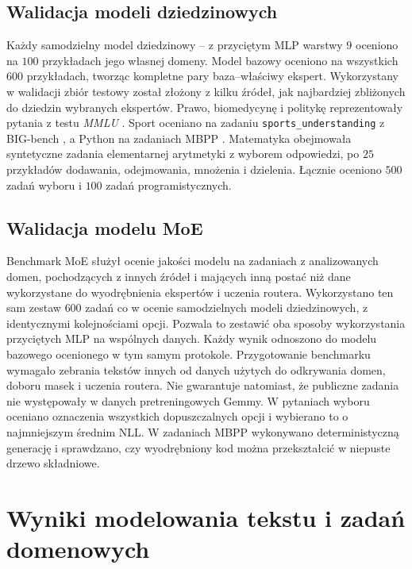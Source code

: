 \subsection{Walidacja modeli dziedzinowych}
\label{subsec:protokol_ekspertow}
Każdy samodzielny model dziedzinowy -- z przyciętym MLP warstwy $9$ oceniono na $100$ przykładach jego własnej domeny. Model bazowy oceniono na wszystkich $600$ przykładach, tworząc kompletne pary baza--właściwy ekspert. Wykorzystany w walidacji zbiór testowy został złożony z kilku źródeł, jak najbardziej zbliżonych do dziedzin wybranych ekspertów. \newline
Prawo, biomedycynę i politykę reprezentowały pytania z testu \textit{MMLU} \cite{hendrycks_2021_measuring_massive_multitask}. Sport oceniano na zadaniu \texttt{sports\_understanding} z BIG-bench \cite{srivastava_2022_beyond_imitation_game}, a Python na zadaniach MBPP \cite{austin_2021_program_synthesis}. Matematyka obejmowała syntetyczne zadania elementarnej arytmetyki z wyborem odpowiedzi, po $25$ przykładów dodawania, odejmowania, mnożenia i dzielenia. Łącznie oceniono $500$ zadań wyboru i $100$ zadań programistycznych.

\subsection{Walidacja modelu MoE}
\label{subsec:protokol_moe}
Benchmark MoE służył ocenie jakości modelu na zadaniach z analizowanych domen, pochodzących z innych źródeł i mających inną postać niż dane wykorzystane do wyodrębnienia ekspertów i uczenia routera. Wykorzystano ten sam zestaw $600$ zadań co w ocenie samodzielnych modeli dziedzinowych, z identycznymi kolejnościami opcji. Pozwala to zestawić oba sposoby wykorzystania przyciętych MLP na wspólnych danych. Każdy wynik odnoszono do modelu bazowego ocenionego w tym samym protokole. \newline
Przygotowanie benchmarku wymagało zebrania tekstów innych od danych użytych do odkrywania domen, doboru masek i uczenia routera. Nie gwarantuje natomiast, że publiczne zadania nie występowały w danych pretreningowych Gemmy. \newline
W pytaniach wyboru oceniano oznaczenia wszystkich dopuszczalnych opcji i wybierano to o najmniejszym średnim NLL. W zadaniach MBPP wykonywano deterministyczną generację i sprawdzano, czy wyodrębniony kod można przekształcić w niepuste drzewo składniowe.

\section{Wyniki modelowania tekstu i zadań domenowych}
\label{sec:wyniki_walidacji}
